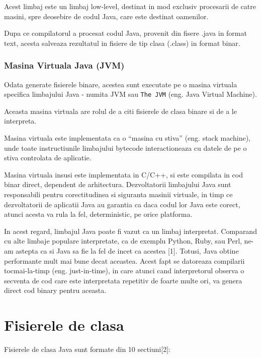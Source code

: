 \documentclass[]{article}
\begin{document}
Acest limbaj este un limbaj low-level, destinat in mod exclusiv
procesarii de catre masini, spre deosebire de codul Java, care este
destinat oamenilor.

Dupa ce compilatorul a procesat codul Java, provenit din fisere .java in
format text, acesta salveaza rezultatul in fisiere de tip clasa (.class)
in format binar.

\subsubsection{Masina Virtuala Java
(JVM)}\label{masina-virtuala-java-jvm}

Odata generate fisierele binare, acestea sunt executate pe o masina
virtuala specifica limbajului Java - numita JVM sau \texttt{The\ JVM}
(eng. Java Virtual Machine).

Aceasta masina virtuala are rolul de a citi fisierele de clasa binare si
de a le interpreta.

Masina virtuala este implementata ca o ``masina cu stiva'' (eng. stack
machine), unde toate instructiunile limbajului bytecode interactioneaza
cu datele de pe o stiva controlata de aplicatie.

Masina virtuala insusi este implementata in C/C++, si este compilata in
cod binar direct, dependent de arhitectura. Dezvoltatorii limbajului
Java sunt responsabili pentru corectitudinea si siguranta masinii
virtuale, in timp ce dezvoltatorii de aplicatii Java au garantia ca daca
codul lor Java este corect, atunci acesta va rula la fel, deterministic,
pe orice platforma.

In acest regard, limbajul Java poate fi vazut ca un limbaj interpretat.
Comparand cu alte limbaje populare interpretate, ca de exemplu Python,
Ruby, sau Perl, ne-am astepta ca si Java sa fie la fel de incet ca
acestea {[}1{]}. Totusi, Java obtine performante mult mai bune decat
aceastea. Acest fapt se datoreaza compilarii tocmai-la-timp (eng.
just-in-time), in care atunci cand interpretorul observa o secventa de
cod care este interpretata repetitiv de foarte multe ori, va genera
direct cod binary pentru aceasta.

\section{Fisierele de clasa}\label{fisierele-de-clasa}

Fisierele de clasa Java sunt formate din 10 sectiuni{[}2{]}:
\end{document}
